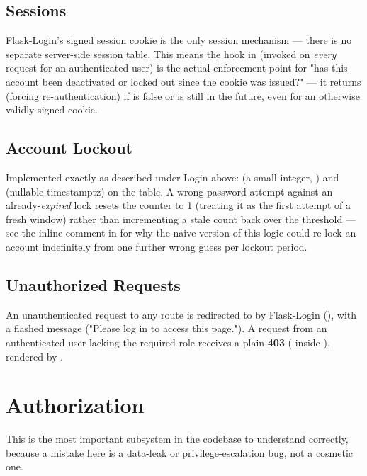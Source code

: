\subsection*{Sessions}

Flask-Login's signed session cookie is the only session mechanism ---
there is no separate server-side session table. This means the
 hook in  (invoked on
\emph{every} request for an authenticated user) is the actual
enforcement point for "has this account been deactivated or locked out
since the cookie was issued?" --- it returns  (forcing
re-authentication) if  is false or 
is still in the future, even for an otherwise validly-signed cookie.

\subsection*{Account Lockout}

Implemented exactly as described under Login above:
 (a small integer, ) and
 (nullable timestamptz) on the  table.
A wrong-password attempt against an already-\emph{expired} lock resets
the counter to 1 (treating it as the first attempt of a fresh window)
rather than incrementing a stale count back over the threshold --- see
the inline comment in  for why the naive version of
this logic could re-lock an account indefinitely from one further wrong
guess per lockout period.

\subsection*{Unauthorized Requests}

An unauthenticated request to any  route is
redirected to  by Flask-Login (), with a flashed message ("Please log in to access this
page."). A request from an authenticated user lacking the required role
receives a plain \textbf{403} ( inside
), rendered by .

\section{Authorization}

This is the most important subsystem in the codebase to understand
correctly, because a mistake here is a data-leak or privilege-escalation
bug, not a cosmetic one.

